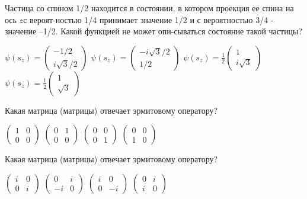 \documentclass[11pt,a4paper]{exam}
\begin{document}
\begin{questions}
\question Частица со спином 1/2 находится в состоянии, в котором проекция ее спина на ось $z$с вероят-ностью 1/4 принимает значение 1/2 и с вероятностью 3/4 - значение –1/2.  Какой функцией не может опи-сываться состояние такой частицы?
\begin{choices}
\choice $\psi ({s_z}) = \left( {\begin{array}{*{20}{c}}
{ - 1/2}\\
{i\sqrt 3 /2}
\end{array}} \right)$      
\choice $\psi ({s_z}) = \left( {\begin{array}{*{20}{c}}
{ - i\sqrt 3 /2}\\
{1/2}
\end{array}} \right)$      
\choice $\psi ({s_z}) = \frac{1}{2}\left( {\begin{array}{*{20}{c}}
1\\
{i\sqrt 3 }
\end{array}} \right)$   
\choice $\psi ({s_z}) = \frac{1}{2}\left( {\begin{array}{*{20}{c}}
1\\
{\sqrt 3 }
\end{array}} \right)$
\end{choices}

\question Какая матрица (матрицы) отвечает эрмитовому оператору?
\begin{choices}
\choice $\left( {\begin{array}{*{20}{c}}
1&0\\
0&0
\end{array}} \right)$   
\choice $\left( {\begin{array}{*{20}{c}}
0&1\\
0&0
\end{array}} \right)$   
\choice $\left( {\begin{array}{*{20}{c}}
0&0\\
0&1
\end{array}} \right)$   
\choice $\left( {\begin{array}{*{20}{c}}
0&0\\
1&0
\end{array}} \right)$
\end{choices}

\question Какая матрица (матрицы) отвечает эрмитовому оператору?
\begin{choices}
\choice $\left( {\begin{array}{*{20}{c}}
i&0\\
0&i
\end{array}} \right)$   
\choice $\left( {\begin{array}{*{20}{c}}
0&i\\
{ - i}&0
\end{array}} \right)$   
\choice $\left( {\begin{array}{*{20}{c}}
i&0\\
0&{ - i}
\end{array}} \right)$   
\choice $\left( {\begin{array}{*{20}{c}}
0&i\\
i&0
\end{array}} \right)$
\end{choices}


\end{questions}
\end{document}
